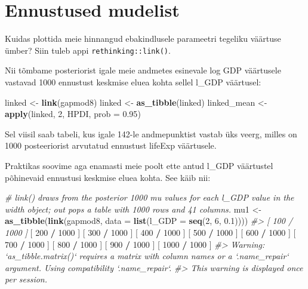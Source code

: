 \documentclass[]{book}
\newenvironment{Shaded}{\begin{snugshade}}{\end{snugshade}}
\newcommand{\CommentTok}[1]{\textcolor[rgb]{0.56,0.35,0.01}{\textit{#1}}}
\newcommand{\DataTypeTok}[1]{\textcolor[rgb]{0.13,0.29,0.53}{#1}}
\newcommand{\DecValTok}[1]{\textcolor[rgb]{0.00,0.00,0.81}{#1}}
\newcommand{\FloatTok}[1]{\textcolor[rgb]{0.00,0.00,0.81}{#1}}
\newcommand{\KeywordTok}[1]{\textcolor[rgb]{0.13,0.29,0.53}{\textbf{#1}}}
\newcommand{\NormalTok}[1]{#1}
\newcommand{\OperatorTok}[1]{\textcolor[rgb]{0.81,0.36,0.00}{\textbf{#1}}}
\newcommand{\StringTok}[1]{\textcolor[rgb]{0.31,0.60,0.02}{#1}}
\begin{document}
\hypertarget{ennustused-mudelist}{%
\section*{Ennustused mudelist}\label{ennustused-mudelist}}

Kuidas plottida meie hinnangud ebakindlusele parameetri tegeliku väärtuse ümber?
Siin tuleb appi \texttt{rethinking::link()}.

Nii tõmbame posteriorist igale meie andmetes esinevale log GDP väärtusele vastavad 1000 ennustust keskmise eluea kohta sellel l\_GDP väärtusel:

\begin{Shaded}
\begin{Highlighting}[]
\NormalTok{linked <-}\StringTok{ }\KeywordTok{link}\NormalTok{(gapmod8)}
\NormalTok{linked <-}\StringTok{ }\KeywordTok{as_tibble}\NormalTok{(linked)}
\NormalTok{linked_mean <-}\StringTok{ }\KeywordTok{apply}\NormalTok{(linked, }\DecValTok{2}\NormalTok{, HPDI, }\DataTypeTok{prob =} \FloatTok{0.95}\NormalTok{)}
\end{Highlighting}
\end{Shaded}

Sel viisil saab tabeli, kus igale 142-le andmepunktist vastab üks veerg, milles on 1000 posteeriorist arvutatud ennustust lifeExp väärtusele.

Praktikas soovime aga enamasti meie poolt ette antud l\_GDP väärtustel põhinevaid ennustusi keskmise eluea kohta. See käib nii:

\begin{Shaded}
\begin{Highlighting}[]
\CommentTok{# link() draws from the posterior 1000 mu values for each l_GDP value in the width object; out pops a table with 1000 rows and 41 columns. }
\NormalTok{mu1 <-}\StringTok{ }\KeywordTok{as_tibble}\NormalTok{(}\KeywordTok{link}\NormalTok{(gapmod8, }\DataTypeTok{data =} \KeywordTok{list}\NormalTok{(}\DataTypeTok{l_GDP =} \KeywordTok{seq}\NormalTok{(}\DecValTok{2}\NormalTok{, }\DecValTok{6}\NormalTok{, }\FloatTok{0.1}\NormalTok{))))}
\CommentTok{#> [ 100 / 1000 ]}
\NormalTok{[ }\DecValTok{200} \OperatorTok{/}\StringTok{ }\DecValTok{1000}\NormalTok{ ]}
\NormalTok{[ }\DecValTok{300} \OperatorTok{/}\StringTok{ }\DecValTok{1000}\NormalTok{ ]}
\NormalTok{[ }\DecValTok{400} \OperatorTok{/}\StringTok{ }\DecValTok{1000}\NormalTok{ ]}
\NormalTok{[ }\DecValTok{500} \OperatorTok{/}\StringTok{ }\DecValTok{1000}\NormalTok{ ]}
\NormalTok{[ }\DecValTok{600} \OperatorTok{/}\StringTok{ }\DecValTok{1000}\NormalTok{ ]}
\NormalTok{[ }\DecValTok{700} \OperatorTok{/}\StringTok{ }\DecValTok{1000}\NormalTok{ ]}
\NormalTok{[ }\DecValTok{800} \OperatorTok{/}\StringTok{ }\DecValTok{1000}\NormalTok{ ]}
\NormalTok{[ }\DecValTok{900} \OperatorTok{/}\StringTok{ }\DecValTok{1000}\NormalTok{ ]}
\NormalTok{[ }\DecValTok{1000} \OperatorTok{/}\StringTok{ }\DecValTok{1000}\NormalTok{ ]}
\CommentTok{#> Warning: `as_tibble.matrix()` requires a matrix with column names or a `.name_repair` argument. Using compatibility `.name_repair`.}
\CommentTok{#> This warning is displayed once per session.}
\end{Highlighting}
\end{Shaded}
\end{document}
